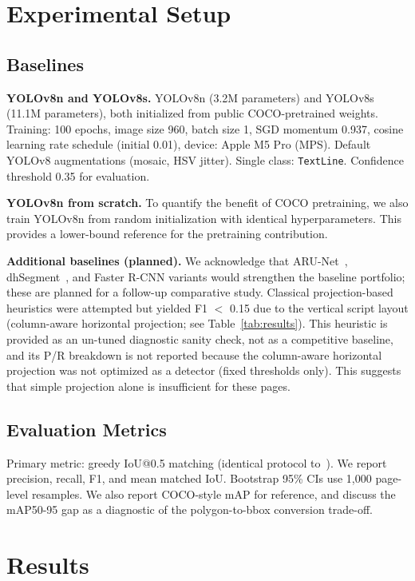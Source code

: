 \documentclass[pdflatex,sn-mathphys-num]{sn-jnl}
\begin{document}
\section{Experimental Setup}
\subsection{Baselines}
\textbf{YOLOv8n and YOLOv8s.} YOLOv8n (3.2M parameters) and YOLOv8s (11.1M parameters), both initialized from public COCO-pretrained weights. Training: 100 epochs, image size 960, batch size 1, SGD momentum 0.937, cosine learning rate schedule (initial 0.01), device: Apple M5 Pro (MPS). Default YOLOv8 augmentations (mosaic, HSV jitter). Single class: \texttt{TextLine}. Confidence threshold 0.35 for evaluation.

\textbf{YOLOv8n from scratch.} To quantify the benefit of COCO pretraining, we also train YOLOv8n from random initialization with identical hyperparameters. This provides a lower-bound reference for the pretraining contribution.

\textbf{Additional baselines (planned).} We acknowledge that ARU-Net~\cite{gruning2019arunet}, dhSegment~\cite{oliveira2018dhsegment}, and Faster R-CNN variants would strengthen the baseline portfolio; these are planned for a follow-up comparative study. Classical projection-based heuristics were attempted but yielded F1 $<$ 0.15 due to the vertical script layout (column-aware horizontal projection; see Table~\ref{tab:results}). This heuristic is provided as an un-tuned diagnostic sanity check, not as a competitive baseline, and its P/R breakdown is not reported because the column-aware horizontal projection was not optimized as a detector (fixed thresholds only). This suggests that simple projection alone is insufficient for these pages.

\subsection{Evaluation Metrics}
Primary metric: greedy IoU@0.5 matching (identical protocol to~\cite{liang2025pilot}). We report precision, recall, F1, and mean matched IoU. Bootstrap 95\% CIs use 1,000 page-level resamples. We also report COCO-style mAP for reference, and discuss the mAP50-95 gap as a diagnostic of the polygon-to-bbox conversion trade-off.

\section{Results}
\end{document}

